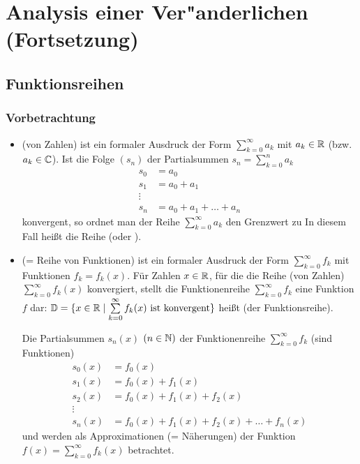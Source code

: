\setcounter{part}{2}
\part{Analysis einer Ver"anderlichen (Fortsetzung)}

\setcounter{chapter}{5}
\chapter{Funktionsreihen}

\section{Vorbetrachtung}
\begin{itemize}
	\item{} (von Zahlen) ist ein formaler Ausdruck der Form $\sum\limits_{k=0}^{\infty}a_k$ mit $a_k\in\mathbb{R}$ (bzw. $a_k\in\mathbb{C}$).
	Ist die Folge $(s_n)$ der Partialsummen $s_n=\sum\limits_{k=0}^{n}a_k$
	\begin{align*}
	s_0&=a_0\\
	s_1&=a_0+a_1\\
	\vdots\\
	s_n&=a_0+a_1+\ldots+a_n
	\end{align*}
	konvergent, so ordnet man der Reihe $\sum\limits_{k=0}^{\infty}a_k$ den Grenzwert zu
	In diesem Fall heißt die Reihe  (oder ).
	
	\item {} (= Reihe von Funktionen) ist ein formaler Ausdruck der Form $\sum\limits_{k=0}^{\infty}f_k$ mit Funktionen $f_k = f_k(x)$.
	Für Zahlen $x\in\mathbb{R}$, für die die Reihe (von Zahlen) $\sum\limits_{k=0}^{\infty}f_k(x)$ konvergiert, stellt die Funktionenreihe $\sum\limits_{k=0}^{\infty}f_k$ eine Funktion $f$ dar:
	$\mathbb{D}=\{x\in\mathbb{R}\mid\sum\limits_{k=0}^{\infty}f_k(x)\text{ ist konvergent}\}$ heißt  (der Funktionsreihe).
	
	Die Partialsummen $s_n(x)$ $(n\in\mathbb{N})$ der Funktionenreihe $\sum\limits_{k=0}^{\infty}f_k$ (sind Funktionen)
	\begin{align*}
	s_0(x)&=f_0(x)\\
	s_1(x)&=f_0(x)+f_1(x)\\
	s_2(x)&=f_0(x)+f_1(x)+f_2(x)\\
	\vdots\\
	s_n(x)&=f_0(x)+f_1(x)+f_2(x)+\ldots+f_n(x)
	\end{align*}
	und werden als Approximationen (= Näherungen) der Funktion $f(x)=\sum\limits_{k=0}^{\infty}f_k(x)$ betrachtet.
\end{itemize}


